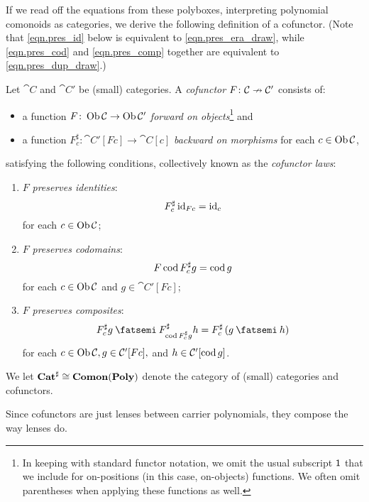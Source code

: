 \documentclass[Book-Poly]{subfiles}
\begin{document}
If we read off the equations from these polyboxes, interpreting polynomial comonoids as categories, we derive the following definition of a cofunctor.
(Note that \eqref{eqn.pres_id} below is equivalent to \eqref{eqn.pres_era_draw}, while \eqref{eqn.pres_cod} and \eqref{eqn.pres_comp} together are equivalent to \eqref{eqn.pres_dup_draw}.)

\begin{definition}[Cofunctor]\label{def.cofunctor}
Let $\cat{C}$ and $\cat{C'}$ be (small) categories.
A \emph{cofunctor} $F\colon\mathcal{C}\nrightarrow\mathcal{C'}$ consists of:
\begin{itemize}
    \item a function $F\colon\operatorname{Ob}\mathcal{C}\to\operatorname{Ob}\mathcal{C'}$ \emph{forward on objects}\footnote{In keeping with standard functor notation, we omit the usual subscript $\textsf{1}$ that we include for on-positions (in this case, on-objects) functions. We often omit parentheses when applying these functions as well.} and
    \item a function $F^\sharp_c\colon\cat{C'}[Fc]\to\cat{C}[c]$ \emph{backward on morphisms} for each $c\in\operatorname{Ob}\mathcal{C}$,
\end{itemize}
satisfying the following conditions, collectively known as the \emph{cofunctor laws}:
\begin{enumerate}[itemsep=0pt, label=\roman*.]
	\item $F$ \emph{preserves identities}:
	\begin{equation} \label{eqn.pres_id}
	    F^\sharp_c\,\mathrm{id}_{Fc}=\mathrm{id}_c
	\end{equation}
	for each $c\in\operatorname{Ob}\mathcal{C}$;
	\item $F$ \emph{preserves codomains}:
	\begin{equation} \label{eqn.pres_cod}
	    F\operatorname{cod} F^\sharp_c g=\operatorname{cod} g
	\end{equation}
	for each $c\in\operatorname{Ob}\mathcal{C}$ and $g\in\cat{C'}[Fc]$;
	\item $F$ \emph{preserves composites}:
	\begin{equation} \label{eqn.pres_comp}
	    F^\sharp_c g\then F^\sharp_{\cod F^\sharp_c g} h=F^\sharp_c\left(g\then h\right)
	\end{equation}
	for each $c\in\operatorname{Ob}\mathcal{C}, g\in\mathcal{C'}[Fc],$ and $h\in\mathcal{C'}[\operatorname{cod} g]$.
\end{enumerate}
We let $\mathbf{Cat}^\sharp\cong\mathbf{Comon}(\mathbf{Poly})$ denote the category of (small) categories and cofunctors.
\end{definition}

Since cofunctors are just lenses between carrier polynomials, they compose the way lenses do.
\end{document}

